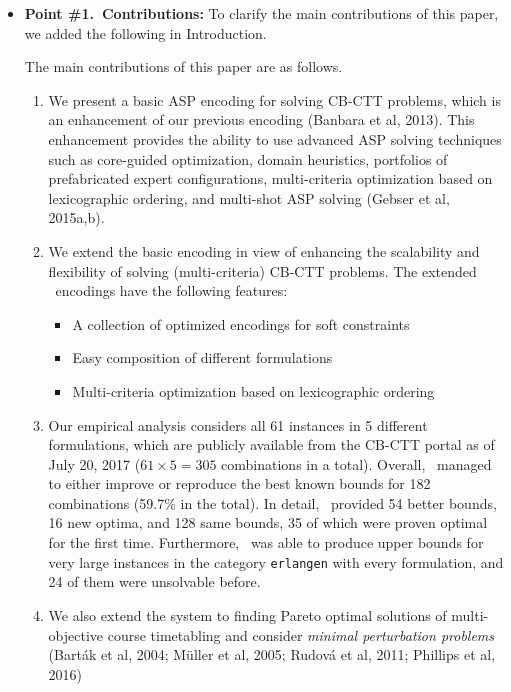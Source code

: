 \documentclass[a4j]{article}
\begin{document}
\begin{itemize}
\item \textbf{Point \#1.~Contributions:} To clarify the main contributions of this
  paper, we added the following in Introduction.\\[1em]
\begin{it}
The main contributions of this paper are as follows.
\begin{enumerate}
\item We present a basic ASP encoding for solving CB-CTT problems, 
  which is an enhancement of our previous encoding (Banbara et al, 2013).
  This enhancement provides the ability to use advanced ASP solving
  techniques such as 
  core-guided optimization, 
  domain heuristics, 
  portfolios of prefabricated expert configurations,
  multi-criteria optimization based on lexicographic ordering, and
  multi-shot ASP solving (Gebser et al, 2015a,b).
\item We extend the basic encoding in view of enhancing the
  scalability and flexibility of solving (multi-criteria) CB-CTT problems.
  The extended \asap\ encodings have the following features:
  \begin{itemize}
  \item A collection of optimized encodings for soft constraints
  \item Easy composition of different formulations
  \item Multi-criteria optimization based on lexicographic ordering
  \end{itemize}
\item Our empirical analysis considers all 61 instances in 5
  different formulations, which are publicly available from the CB-CTT
  portal as of July 20, 2017
  ($61\times 5 = 305$ combinations in a total).
  Overall, \asap\ managed to either improve or reproduce the best
  known bounds for 182 combinations (59.7\% in the total).
  In detail, \asap\ provided 54 better bounds, 
  16 new optima,
  and 128 same bounds, 
  35 of which were proven optimal for the first time.
  Furthermore,
  \asap\ was able to produce upper bounds for very large instances in
  the category \verb+erlangen+ with every formulation, and 24 of them
  were unsolvable before.
\item We also extend the {\asap} system to finding Pareto optimal solutions
  of multi-objective course timetabling and consider
  \textit{minimal perturbation problems}
 (Bart{\'{a}}k et al, 2004; M{\"{u}}ller et al, 2005; Rudov{\'{a}} et al, 2011; Phillips et al, 2016) 

\end{enumerate}
\end{it}
\end{itemize}
\end{document}

